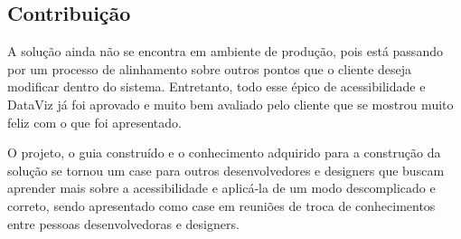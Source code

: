\subsection{Contribuição}
{⁠A solução ainda não se encontra em ambiente de produção, pois está passando por um processo de alinhamento sobre outros pontos que o cliente deseja modificar dentro do sistema. Entretanto, todo esse épico de acessibilidade e DataViz já foi aprovado e muito bem avaliado pelo cliente que se mostrou muito feliz com o que foi apresentado.

O projeto, o guia construído e o conhecimento adquirido para a construção da solução se tornou um case para outros desenvolvedores e designers que buscam aprender mais sobre a acessibilidade e aplicá-la de um modo descomplicado e correto, sendo apresentado como case em reuniões de troca de conhecimentos entre pessoas desenvolvedoras e designers. 

}
